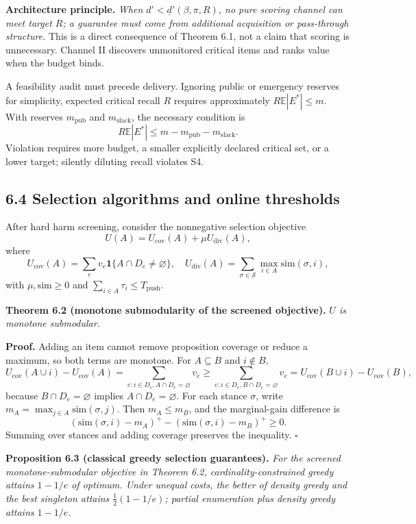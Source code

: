 \documentclass[
  11pt]{article}
\begin{document}
\textbf{Architecture principle.} \emph{When \(d'<\underline d'(\beta,\pi,R)\), no pure scoring channel can meet target \(R\); a guarantee must come from additional acquisition or pass-through structure.} This is a direct consequence of Theorem 6.1, not a claim that scoring is unnecessary. Channel II discovers unmonitored critical items and ranks value when the budget binds.

A feasibility audit must precede delivery. Ignoring public or emergency reserves for simplicity, expected critical recall \(R\) requires approximately \(R\mathbb E|E^*|\leq m\). With reserves \(m_{\mathrm{pub}}\) and \(m_{\mathrm{slack}}\), the necessary condition is \[
R\mathbb E|E^*|\leq m-m_{\mathrm{pub}}-m_{\mathrm{slack}}.
\tag{11}
\] Violation requires more budget, a smaller explicitly declared critical set, or a lower target; silently diluting recall violates S4.

\subsection{6.4 Selection algorithms and online thresholds}\label{selection-algorithms-and-online-thresholds}

After hard harm screening, consider the nonnegative selection objective \[
U(A)=U_{\mathrm{cov}}(A)+\mu U_{\mathrm{div}}(A),
\] where \[
U_{\mathrm{cov}}(A)=\sum_ev_e\mathbf 1\{A\cap D_e\neq\varnothing\},
\quad
U_{\mathrm{div}}(A)=\sum_{\sigma\in\mathcal S}\max_{i\in A}\mathrm{sim}(\sigma,i),
\] with \(\mu,\mathrm{sim}\geq0\) and \(\sum_{i\in A}\tau_i\leq T_{\mathrm{push}}\).

\textbf{Theorem 6.2 (monotone submodularity of the screened objective).} \emph{\(U\) is monotone submodular.}

\textbf{Proof.} Adding an item cannot remove proposition coverage or reduce a maximum, so both terms are monotone. For \(A\subseteq B\) and \(i\notin B\), \[
U_{\mathrm{cov}}(A\cup i)-U_{\mathrm{cov}}(A)
=\sum_{e:i\in D_e,A\cap D_e=\varnothing}v_e
\geq\sum_{e:i\in D_e,B\cap D_e=\varnothing}v_e
=U_{\mathrm{cov}}(B\cup i)-U_{\mathrm{cov}}(B),
\] because \(B\cap D_e=\varnothing\) implies \(A\cap D_e=\varnothing\). For each stance \(\sigma\), write \(m_A=\max_{j\in A}\mathrm{sim}(\sigma,j)\). Then \(m_A\leq m_B\), and the marginal-gain difference is \[
(\mathrm{sim}(\sigma,i)-m_A)^+-(\mathrm{sim}(\sigma,i)-m_B)^+\geq0.
\] Summing over stances and adding coverage preserves the inequality. \(\square\)

\textbf{Proposition 6.3 (classical greedy selection guarantees).} \emph{For the screened monotone-submodular objective in Theorem 6.2, cardinality-constrained greedy attains \(1-1/e\) of optimum. Under unequal costs, the better of density greedy and the best singleton attains \(\tfrac12(1-1/e)\); partial enumeration plus density greedy attains \(1-1/e\).}
\end{document}
